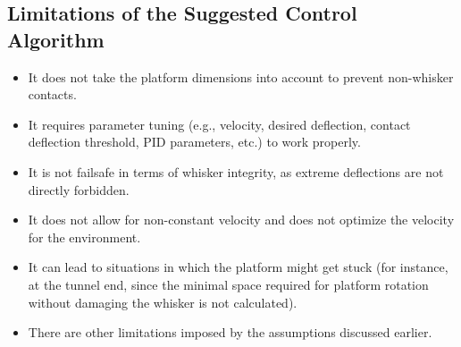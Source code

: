 \subsection{Limitations of the Suggested Control Algorithm}
\begin{itemize}
    \item It does not take the platform dimensions into account to prevent non-whisker contacts.
    \item It requires parameter tuning (e.g., velocity, desired deflection, contact deflection threshold, PID parameters, etc.) to work properly.
    \item It is not failsafe in terms of whisker integrity, as extreme deflections are not directly forbidden.
    \item It does not allow for non-constant velocity and does not optimize the velocity for the environment.
    \item It can lead to situations in which the platform might get stuck (for instance, at the tunnel end, since the minimal space required for platform rotation without damaging the whisker is not calculated).
    \item There are other limitations imposed by the assumptions discussed earlier.
\end{itemize}
